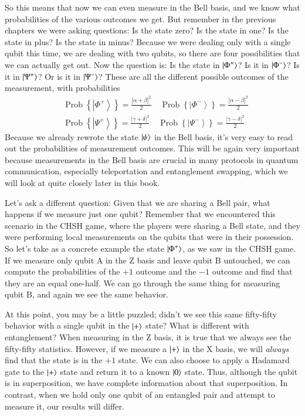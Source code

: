 So this means that now we can even measure in the Bell basis, and we know what probabilities of the various outcomes we get. But remember in the previous chapters we were asking questions: Is the state zero? Is the state in one? Is the state in plus? Is the state in minus? Because we were dealing only with a single qubit this time, we are dealing with two qubits, so there are four possibilities that we can actually get out. Now the question is: Is the state in $\left| \Phi^+ \right\rangle$? Is it in $\left| \Phi^- \right\rangle$? Is it in $\left| \Psi^+ \right\rangle$? Or is it in $\left| \Psi^- \right\rangle$? These are all the different possible outcomes of the measurement, with probabilities
\begin{equation}
\begin{aligned}
&\operatorname{Prob}\left\{\left|\Phi^{+}\right\rangle\right\}=\frac{|\alpha+\beta|^{2}}{2} \quad \operatorname{Prob}\left\{\left|\Phi^{-}\right\rangle\right\}=\frac{|\alpha-\beta|^{2}}{2} \\
&\operatorname{Prob}\left\{\left|\Psi^{+}\right\rangle\right\}=\frac{|\gamma+\delta|^{2}}{2} \quad \operatorname{Prob}\left\{\left|\Psi^{-}\right\rangle\right\}=\frac{|\gamma-\delta|^{2}}{2}
\end{aligned}
\end{equation}
Because we already rewrote the state $\left| \psi \right\rangle$ in the Bell basis, it's very easy to read out the probabilities of measurement outcomes.
This will be again very important because measurements in the Bell basis are crucial in many protocols in quantum communication, especially teleportation and entanglement swapping, which we will look at quite closely later in this book.

Let's ask a different question: Given that we are sharing a Bell pair, what happens if we measure just one qubit? Remember that we encountered this scenario in the CHSH game, where the players were sharing a Bell state, and they were performing local measurements on the qubits that were in their possession. So let's take as a concrete example the state $\left| \Phi^+ \right\rangle$, as we saw in the CHSH game. If we measure only qubit A in the Z basis and leave qubit B untouched, we can compute the probabilities of the $+1$ outcome and the $-1$ outcome and find that they are an equal one-half.   We can go through the same thing for measuring qubit B, and again we see the same behavior.

\label{page:plus-is-pure}
At this point, you may be a little puzzled; didn't we see this same fifty-fifty behavior with a single qubit in the $\left| + \right\rangle$ state?  What is different with entanglement?  When measuring in the Z basis, it is true that we always see the fifty-fifty statistics.  However, if we measure a $\left| + \right\rangle$ in the X basis, we will \emph{always} find that the state is in the $+1$ state.  We can also choose to apply a Hadamard gate to the $\left| + \right\rangle$ state and return it to a known $\left| 0 \right\rangle$ state.  Thus, although the qubit is in superposition, we have complete information about that superposition.  In contrast, when we hold only one qubit of an entangled pair and attempt to measure it, our results will differ.

